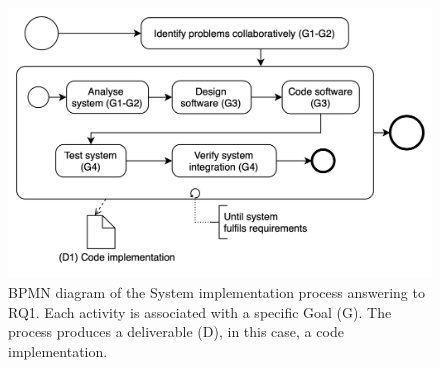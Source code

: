 \begin{figure}[!ht]
    \begin{center}
      \includegraphics[width=\textwidth]{figures/3-method/research_process_rq1.png}
    \caption{\gls{BPMN} diagram of the System implementation process answering to RQ1. Each activity is associated with a specific Goal (\gls{G}). The process produces a deliverable (\gls{D}), in this case, a code implementation.}
    \label{fig:DevProcessRQ1}
    \end{center}
\end{figure}

